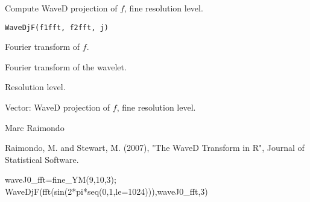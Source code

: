 \documentclass{article}
\begin{document}
\begin{Description}\relax
Compute WaveD projection of $f$, fine resolution level.
\end{Description}
\begin{Usage}
\begin{verbatim}
WaveDjF(f1fft, f2fft, j)
\end{verbatim}
\end{Usage}
\begin{Arguments}
\begin{ldescription}
\item[\code{y\_fft}] Fourier transform of $f$. 
\item[\code{f2fft}] Fourier transform of the wavelet.
\item[\code{j}] Resolution level. 
\end{ldescription}
\end{Arguments}
\begin{Value}
Vector:  WaveD projection of $f$, fine resolution level.
\end{Value}
\begin{Author}\relax
Marc Raimondo
\end{Author}
\begin{References}\relax
Raimondo, M. and Stewart, M. (2007),
"The WaveD Transform in R", Journal of Statistical Software.
\end{References}
\begin{SeeAlso}\relax
{}
\end{SeeAlso}
\begin{Examples}
\begin{ExampleCode}

waveJ0_fft=fine_YM(9,10,3);
WaveDjF(fft(sin(2*pi*seq(0,1,le=1024))),waveJ0_fft,3)
\end{ExampleCode}
\end{Examples}
\end{document}
